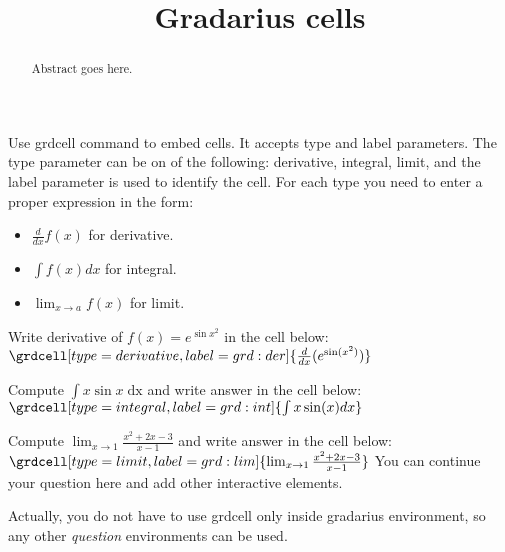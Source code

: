 \documentclass{ximera}
\title{Gradarius cells}
\begin{document}
\begin{abstract}
Abstract goes here.
\end{abstract}

\maketitle

Use {\sf grdcell} command to embed  cells.
It accepts {\sf type} and {\sf label} parameters.
The {\sf type} parameter can be on of the following: {\sf derivative, integral, limit}, and
the {\sf label} parameter is used to identify the cell.
For each {\sf type} you need to enter a proper expression in the form:
\begin{itemize}
\item $\frac{d}{dx} f(x)$ for {\sf derivative}.
\item $\int{f(x) dx}$ for {\sf integral}.
\item $\lim_{x \to a} f(x)$ for {\sf limit}.
\end{itemize}

\begin{gradarius}
Write derivative of $f(x) = e^{\sin x^2}$ in the cell below:
$\grdcell[type=derivative,label=grd:der]{\frac{d}{dx}(e^{\sin( x^2)})}$
\end{gradarius}

\begin{gradarius}
Compute $\int x \sin x \; \mathrm{dx}$ and write answer in the cell below:
$\grdcell[type=integral,label=grd:int]{\int{x \sin(x) dx}}$
\end{gradarius}

\begin{gradarius}
Compute $\lim_{x \to 1} \frac{x^2+2x-3}{x-1}$ and write answer in the cell below:
$\grdcell[type=limit,label=grd:lim]{\lim_{x \to 1} \frac{x^2+2x-3}{x-1}}$
You can continue your question here and add other interactive elements.
\end{gradarius}

Actually, you do not have to use {\sf grdcell} only inside {\sf gradarius} environment, so any other {\it question} environments can be used.
\end{document}
